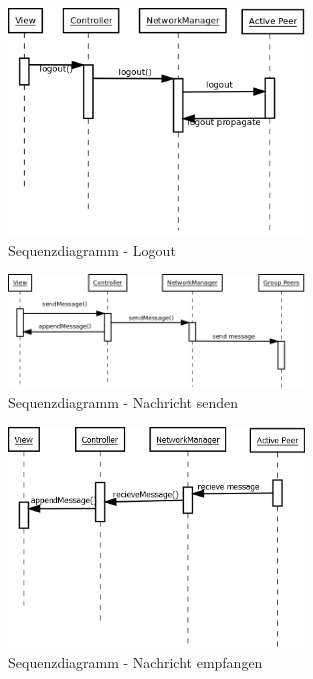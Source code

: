 \documentclass[paper=a4, fontsize=11pt]{scrreprt}
\numberwithin{equation}{section}
\numberwithin{figure}{section}
\numberwithin{table}{section}
\begin{document}
\begin{figure}[!htb] 
  \centering
     \includegraphics[width=0.7\textwidth]{resources/logout-sequence.png}
  \caption{Sequenzdiagramm - Logout}
  \label{fig:logout-diagramm}
\end{figure}

\begin{figure}[!htb] 
  \centering
     \includegraphics[width=0.7\textwidth]{resources/message-sequence.png}
  \caption{Sequenzdiagramm - Nachricht senden}
  \label{fig:send-diagram}
\end{figure}

\begin{figure}[!htb] 
  \centering
     \includegraphics[width=0.7\textwidth]{resources/recieve_message-sequence.png}
  \caption{Sequenzdiagramm - Nachricht empfangen}
  \label{fig:rec-diagram}
\end{figure}
\end{document}
